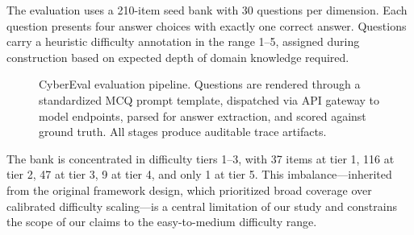 \documentclass[journal]{IEEEtran}
\begin{document}
The evaluation uses a 210-item seed bank with 30 questions per dimension. Each question presents four answer choices with exactly one correct answer. Questions carry a heuristic difficulty annotation in the range 1--5, assigned during construction based on expected depth of domain knowledge required.

\begin{figure}[t]
\centering
{}
\caption{CyberEval evaluation pipeline. Questions are rendered through a standardized MCQ prompt template, dispatched via API gateway to model endpoints, parsed for answer extraction, and scored against ground truth. All stages produce auditable trace artifacts.}
\label{fig:architecture}
\end{figure}

The bank is concentrated in difficulty tiers 1--3, with 37 items at tier 1, 116 at tier 2, 47 at tier 3, 9 at tier 4, and only 1 at tier 5. This imbalance---inherited from the original framework design, which prioritized broad coverage over calibrated difficulty scaling---is a central limitation of our study and constrains the scope of our claims to the easy-to-medium difficulty range.
\end{document}

